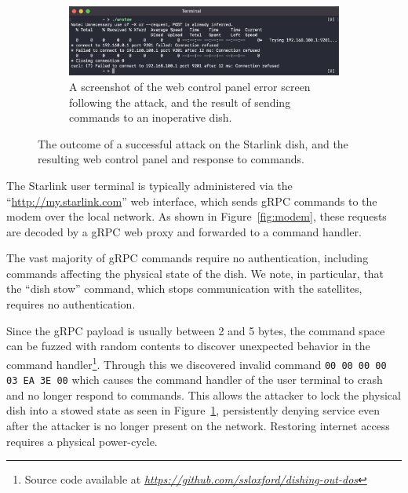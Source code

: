 \begin{figure}
\begin{subfigure}{.4912\textwidth}
        \centering\includegraphics[width=\textwidth]{img/unstow.png}
        \caption{A screenshot of the web control panel error screen following the attack, and the result of sending commands to an inoperative dish.}
    \end{subfigure}
\vspace{-0.7em}
\caption{The outcome of a successful attack on the Starlink dish, and the resulting web control panel and response to commands.}
\label{fig:attack-outcome}
\vspace{-1.5em}
\end{figure}

The Starlink user terminal is typically administered via the ``\url{http://my.starlink.com}'' web interface, which sends gRPC commands to the modem over the local network.
As shown in Figure~\ref{fig:modem}, these requests are decoded by a gRPC web proxy and forwarded to a command handler.

The vast majority of gRPC commands require no authentication, including commands affecting the physical state of the dish.
We note, in particular, that the ``dish stow'' command, which stops communication with the satellites, requires no authentication.

Since the gRPC payload is usually between 2 and 5 bytes, the command space can be fuzzed with random contents to discover unexpected behavior in the command handler\footnote{Source code available at \textit{\url{https://github.com/ssloxford/dishing-out-dos}}}.
Through this we discovered invalid command \lstinline{00 00 00 00 03 EA 3E 00} which causes the command handler of the user terminal to crash and no longer respond to commands.
This allows the attacker to lock the physical dish into a stowed state as seen in Figure~\ref{fig:attack-outcome}, persistently denying service even after the attacker is no longer present on the network.
Restoring internet access requires a physical power-cycle.
